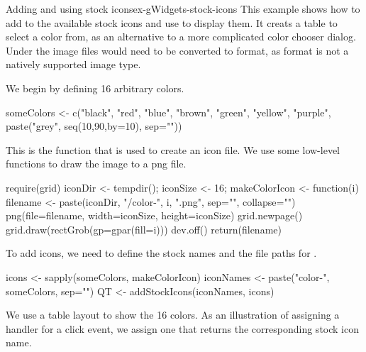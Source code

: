 \begin{example}{Adding and using stock icons}{ex-gWidgets-stock-icons}
This example shows how to add to the available stock icons and use
 to display them. It creats a table to select a color
from, as an alternative to a more complicated color chooser dialog. Under  the image
files would need to be converted to  format, as 
format is not a natively supported image type. 

We begin by defining 16 arbitrary colors.

\begin{Schunk}
\begin{Sinput}
 someColors <- c("black", "red", "blue", "brown",
                 "green", "yellow", "purple",
                 paste("grey", seq(10,90,by=10), sep=""))
\end{Sinput}
\end{Schunk}

This is the function that is used to create an icon file. We use some
low-level  functions to draw the image to a png file.
\begin{Schunk}
\begin{Sinput}
 require(grid)
 iconDir <- tempdir(); iconSize <- 16;
 makeColorIcon <- function(i) {
   filename <- paste(iconDir, "/color-", i, ".png",
                     sep="", collapse="")
   png(file=filename, width=iconSize, height=iconSize)
   grid.newpage()
   grid.draw(rectGrob(gp=gpar(fill=i)))
   dev.off()
   return(filename)
 }
\end{Sinput}
\end{Schunk}

To add icons, we need to define the stock names and the file paths for
.

\begin{Schunk}
\begin{Sinput}
 icons <- sapply(someColors, makeColorIcon)
 iconNames <- paste("color-", someColors, sep="")
 QT <- addStockIcons(iconNames, icons)
\end{Sinput}
\end{Schunk}

We use a table layout to show the 16 colors. As an illustration of
assigning a handler for a click event, we assign one that returns the
corresponding stock icon name.

\begin{Schunk}
\end{Schunk}
\end{example}

